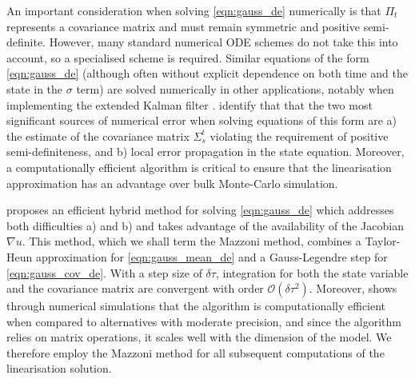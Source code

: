 An important consideration  when solving \cref{eqn:gauss_de} numerically is that \(\Pi_t\) represents a covariance matrix and must remain symmetric and positive semi-definite.
However, many standard numerical ODE schemes do not take this into account, so a specialised scheme is required.
Similar equations of the form \cref{eqn:gauss_de} (although often without explicit dependence on both time and the state in the \(\sigma\) term) are solved numerically in other applications, notably when implementing the extended Kalman filter \citep{Jazwinski_2014_StochasticProcessesFiltering, KulikovaKulikov_2014_AdaptiveODESolvers}.
\citet{KulikovaKulikov_2014_AdaptiveODESolvers} identify that that the two most significant sources of numerical error when solving equations of this form are a) the estimate of the covariance matrix \(\Sigma_s^t\) violating the requirement of positive semi-definiteness, and b) local error propagation in the state equation.
Moreover, a computationally efficient algorithm is critical to ensure that the linearisation approximation has an advantage over bulk Monte-Carlo simulation.

\citet{Mazzoni_2008_ComputationalAspectsContinuous} proposes an efficient hybrid method for solving \cref{eqn:gauss_de} which addresses both difficulties a) and b) and takes advantage of the availability of the Jacobian \(\nabla u\).
This method, which we shall term the Mazzoni method, combines a Taylor-Heun approximation for \cref{eqn:gauss_mean_de} and a Gauss-Legendre step for \cref{eqn:gauss_cov_de}.
With a step size of \(\delta \tau\), integration for both the state variable and the covariance matrix are convergent with order \(\mathcal{O}\!\left(\delta \tau^2\right)\).
Moreover, \citet{Mazzoni_2008_ComputationalAspectsContinuous} shows through numerical simulations that the algorithm is computationally efficient when compared to alternatives with moderate precision, and since the algorithm relies on matrix operations, it scales well with the dimension of the model.
We therefore employ the Mazzoni method for all subsequent computations of the linearisation solution.

